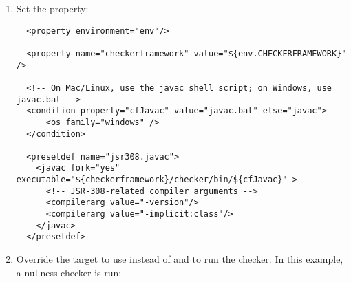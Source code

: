 \begin{enumerate}
\item
Set the  property:

\begin{smaller}
\begin{Verbatim}
  <property environment="env"/>

  <property name="checkerframework" value="${env.CHECKERFRAMEWORK}" />

  <!-- On Mac/Linux, use the javac shell script; on Windows, use javac.bat -->
  <condition property="cfJavac" value="javac.bat" else="javac">
      <os family="windows" />
  </condition>

  <presetdef name="jsr308.javac">
    <javac fork="yes" executable="${checkerframework}/checker/bin/${cfJavac}" >
      <!-- JSR-308-related compiler arguments -->
      <compilerarg value="-version"/>
      <compilerarg value="-implicit:class"/>
    </javac>
  </presetdef>
\end{Verbatim}
\end{smaller}

\item
Override the  target to
use  instead of  and to run the checker.
In this example, a nullness checker is run:


\end{enumerate}
